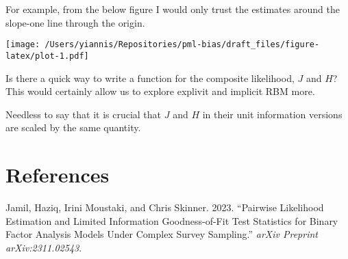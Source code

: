 \documentclass[
]{article}
\newenvironment{Shaded}{\begin{snugshade}}{\end{snugshade}}
\newcommand{\AttributeTok}[1]{\textcolor[rgb]{0.13,0.29,0.53}{#1}}
\newcommand{\DecValTok}[1]{\textcolor[rgb]{0.00,0.00,0.81}{#1}}
\newcommand{\FunctionTok}[1]{\textcolor[rgb]{0.13,0.29,0.53}{\textbf{#1}}}
\newcommand{\NormalTok}[1]{#1}
\newcommand{\SpecialCharTok}[1]{\textcolor[rgb]{0.81,0.36,0.00}{\textbf{#1}}}
\newcommand{\StringTok}[1]{\textcolor[rgb]{0.31,0.60,0.02}{#1}}
\newlength{\cslhangindent}
\newenvironment{CSLReferences}[2] %
 {\begin{list}{}{%
  \setlength{\itemindent}{0pt}
  \setlength{\leftmargin}{0pt}
  \setlength{\parsep}{0pt}
  \ifodd #1
   \setlength{\leftmargin}{\cslhangindent}
   \setlength{\itemindent}{-1\cslhangindent}
  \fi
  \setlength{\itemsep}{#2\baselineskip}}}
 {\end{list}}
\begin{document}
For example, from the below figure I would only trust the estimates
around the slope-one line through the origin.

\begin{Shaded}
\end{Shaded}

\texttt{[image: /Users/yiannis/Repositories/pml-bias/draft\_files/figure-latex/plot-1.pdf]}

Is there a quick way to write a function for the composite likelihood,
\(J\) and \(H\)? This would certainly allow us to explore explivit and
implicit RBM more.

Needless to say that it is crucial that \(J\) and \(H\) in their unit
information versions are scaled by the same quantity.

\section*{References}\label{references}

\label{refs}
\begin{CSLReferences}{1}{0}
Jamil, Haziq, Irini Moustaki, and Chris Skinner. 2023. {``Pairwise
Likelihood Estimation and Limited Information Goodness-of-Fit Test
Statistics for Binary Factor Analysis Models Under Complex Survey
Sampling.''} \emph{arXiv Preprint arXiv:2311.02543}.

\end{CSLReferences}
\end{document}
